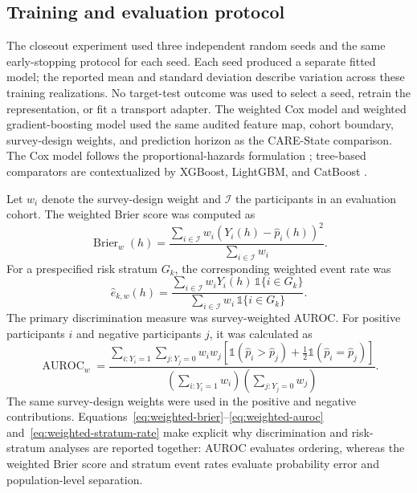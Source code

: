 \documentclass[12pt]{article}
\begin{document}
\subsection{Training and evaluation protocol}
The closeout experiment used three independent random seeds and the same early-stopping protocol for each seed. Each seed produced a separate fitted model; the reported mean and standard deviation describe variation across these training realizations. No target-test outcome was used to select a seed, retrain the representation, or fit a transport adapter. The weighted Cox model and weighted gradient-boosting model used the same audited feature map, cohort boundary, survey-design weights, and prediction horizon as the CARE-State comparison. The Cox model follows the proportional-hazards formulation \cite{cox_1972_regression}; tree-based comparators are contextualized by XGBoost, LightGBM, and CatBoost \cite{chen_2016_xgboost,ke_2017_lightgbm,prokhorenkova_2018_catboost}.

Let $w_i$ denote the survey-design weight and $\mathcal{I}$ the participants in an evaluation cohort. The weighted Brier score was computed as
\begin{equation}
 \operatorname{Brier}_w(h)=
 \frac{\sum_{i\in\mathcal{I}}w_i\left(Y_i(h)-\hat p_i(h)\right)^2}
 {\sum_{i\in\mathcal{I}}w_i}.
 \label{eq:weighted-brier}
\end{equation}
For a prespecified risk stratum $G_k$, the corresponding weighted event rate was
\begin{equation}
 \hat e_{k,w}(h)=
 \frac{\sum_{i\in\mathcal{I}}w_iY_i(h)\,\mathbb{1}\{i\in G_k\}}
 {\sum_{i\in\mathcal{I}}w_i\,\mathbb{1}\{i\in G_k\}}.
 \label{eq:weighted-stratum-rate}
\end{equation}
The primary discrimination measure was survey-weighted AUROC. For positive participants $i$ and negative participants $j$, it was calculated as
\begin{equation}
 \operatorname{AUROC}_w=\frac{\sum_{i:Y_i=1}\sum_{j:Y_j=0}w_iw_j\left[\mathbb{1}(\hat p_i>\hat p_j)+\frac{1}{2}\mathbb{1}(\hat p_i=\hat p_j)\right]}{\left(\sum_{i:Y_i=1}w_i\right)\left(\sum_{j:Y_j=0}w_j\right)}.
 \label{eq:weighted-auroc}
\end{equation}
The same survey-design weights were used in the positive and negative contributions. Equations~\ref{eq:weighted-brier}--\ref{eq:weighted-auroc} and~\ref{eq:weighted-stratum-rate} make explicit why discrimination and risk-stratum analyses are reported together: AUROC evaluates ordering, whereas the weighted Brier score and stratum event rates evaluate probability error and population-level separation.
\end{document}
